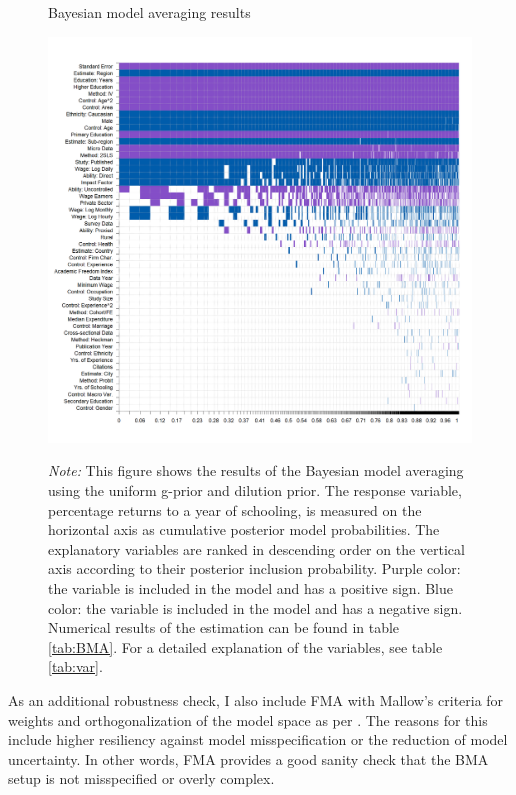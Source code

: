 \begin{figure}[!t]
\begin{center}
\caption{Bayesian model averaging results}
\label{fig:BMA}
\includegraphics[width=1\textwidth]{Figures/BMA/bma_UIP_dilut_results.png}
\end{center}\vspace{-0.5cm}
\captionsetup{width=0.95\textwidth, font = scriptsize}
\caption*{\emph{Note:} This figure shows the results of the Bayesian model averaging using the uniform g-prior and dilution prior. The response variable, percentage returns to a year of schooling, is measured on the horizontal axis as cumulative posterior model probabilities. The explanatory variables are ranked in descending order on the vertical axis according to their posterior inclusion probability. Purple color: the variable is included in the model and has a positive sign. Blue color: the variable is included in the model and has a negative sign. Numerical results of the estimation can be found in table \ref{tab:BMA}. For a detailed explanation of the variables, see table \ref{tab:var}.
}
\end{figure}

As an additional robustness check, I also include \ac{FMA} with Mallow's criteria for weights \citep{hansen2007least} and orthogonalization of the model space as per \cite{amini2012comparison}. The reasons for this include higher resiliency against model misspecification or the reduction of model uncertainty. In other words, \ac{FMA} provides a good sanity check that the \ac{BMA} setup is not misspecified or overly complex.

